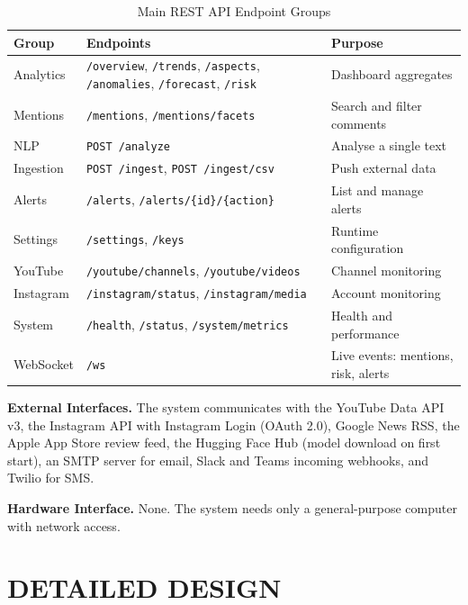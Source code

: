 \documentclass[12pt,a4paper]{report}
\newcommand{\cellpadding}{\renewcommand{\arraystretch}{1.2}}
\begin{document}
\begin{table}[H]
\centering
\cellpadding
\caption{Main REST API Endpoint Groups}
\label{tab:api}
\begin{tabular}{|P{2.6cm}|P{6.6cm}|P{4.6cm}|}
\hline
\textbf{Group} & \textbf{Endpoints} & \textbf{Purpose} \\
\hline
Analytics & \texttt{/overview}, \texttt{/trends}, \texttt{/aspects}, \texttt{/anomalies}, \texttt{/forecast}, \texttt{/risk} & Dashboard aggregates \\
\hline
Mentions & \texttt{/mentions}, \texttt{/mentions/facets} & Search and filter comments \\
\hline
NLP & \texttt{POST /analyze} & Analyse a single text \\
\hline
Ingestion & \texttt{POST /ingest}, \texttt{POST /ingest/csv} & Push external data \\
\hline
Alerts & \texttt{/alerts}, \texttt{/alerts/\{id\}/\{action\}} & List and manage alerts \\
\hline
Settings & \texttt{/settings}, \texttt{/keys} & Runtime configuration \\
\hline
YouTube & \texttt{/youtube/channels}, \texttt{/youtube/videos} & Channel monitoring \\
\hline
Instagram & \texttt{/instagram/status}, \texttt{/instagram/media} & Account monitoring \\
\hline
System & \texttt{/health}, \texttt{/status}, \texttt{/system/metrics} & Health and performance \\
\hline
WebSocket & \texttt{/ws} & Live events: mentions, risk, alerts \\
\hline
\end{tabular}
\end{table}

\textbf{External Interfaces.} The system communicates with the YouTube Data API v3, the Instagram API with Instagram Login (OAuth 2.0), Google News RSS, the Apple App Store review feed, the Hugging Face Hub (model download on first start), an SMTP server for email, Slack and Teams incoming webhooks, and Twilio for SMS.

\textbf{Hardware Interface.} None. The system needs only a general-purpose computer with network access.

\chapter{DETAILED DESIGN}
\end{document}
